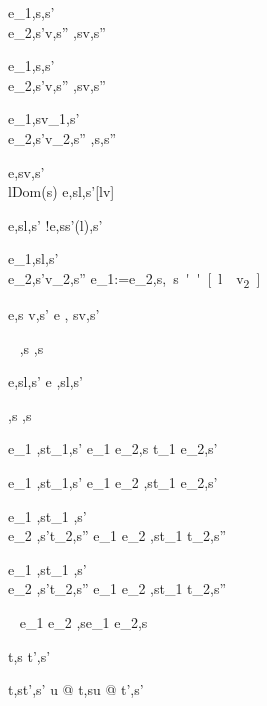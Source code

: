     {e_1,s\evaluate \True,s'\\
     e_2,s'\evaluate v,s''}
    {,s\evaluate v,s''}

  {e_1,s\evaluate \False,s'\\
   e_2,s'\evaluate v,s''}
  {,s\evaluate v,s''}

  {e_1,s\evaluate v_1,s'\\
   e_2,s'\evaluate v_2,s''}
  {,s\evaluate{},s''}

  {e,s\evaluate v,s'\\
   l\not\in Dom(s)}
  {\Ref e,s\evaluate l,s'[l\mapsto v]}

  {e,s\evaluate l,s'}
  {!e,s\evaluate s'(l),s'}

  {e_1,s\evaluate l,s'\\
   e_2,s'\evaluate v_2,s''}
  {e_1:=e_2,s\evaluate \unit,s''[l\mapsto v_2]}

  {e,s \evaluate v,s'}
  {\Edit e , s\evaluate \Edit v,s'}

  {\ }
  {\Enter \tau,s \evaluate \Enter \tau,s}

  {e,s\evaluate l,s'}
  {\Update e ,s\evaluate \Update l,s'}


  { }
  {\Fail,s \evaluate \Fail,s}


  {e_1 ,s\evaluate t_1,s'}
  {e_1 \Then e_2,s \evaluate t_1 \Then e_2,s'}

  {e_1 ,s\evaluate t_1,s'}
  {e_1 \Next e_2 ,s\evaluate t_1 \Next e_2,s'}


  {e_1 ,s\evaluate t_1 ,s'\\
   e_2 ,s'\evaluate t_2,s''}
  {e_1 \And e_2 ,s\evaluate t_1 \And t_2,s''}


  {e_1 ,s\evaluate t_1 ,s'\\
   e_2 ,s'\evaluate t_2,s''}
  {e_1 \Or e_2 ,s\evaluate t_1 \Or t_2,s''}

  {\ }
  {e_1 \Xor e_2 ,s\evaluate e_1 \Xor e_2,s}







  {t,s \normalise t',s'}


    {t,s\normalise t',s'}
    {u @ t,s\normalise u @ t',s'}

